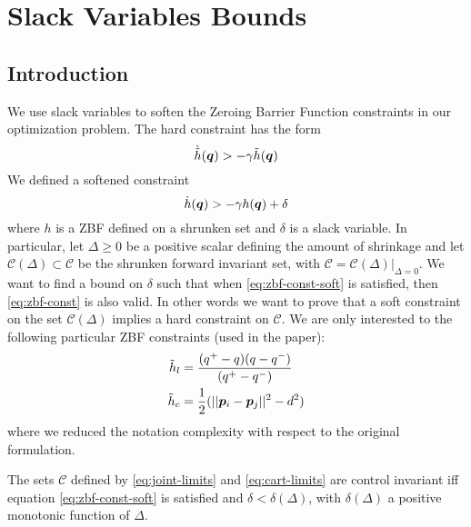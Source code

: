 \section{Slack Variables Bounds} \label{app:slack}
\subsection{Introduction}
We use slack variables to soften the Zeroing Barrier Function constraints in our optimization problem. The hard constraint has the form
\begin{equation} \label{eq:zbf-const}
    \dot{\tilde{h}}(\bm{q}) > -\gamma \tilde{h}(\bm{q})
\end{equation}
We defined a softened constraint
\begin{equation} \label{eq:zbf-const-soft}
    \dot{h}(\bm{q}) > -\gamma h(\bm{q}) + \delta
\end{equation}
where $h$ is a ZBF defined on a shrunken set and $\delta$ is a slack variable. In particular, let $\Delta \geq 0$ be a positive scalar defining the amount of shrinkage and let $\mathcal{C}(\Delta) \subset \mathcal{C}$ be the shrunken forward invariant set, with $\mathcal{C} = \mathcal{C}(\Delta)|_{\Delta=0}$. We want to find a bound on $\delta$ such that when \eqref{eq:zbf-const-soft} is satisfied, then \eqref{eq:zbf-const} is also valid. In other words we want to prove that a soft constraint on the set $\mathcal{C}(\Delta)$ implies a hard constraint on $\mathcal{C}$. We are only interested to the following particular ZBF constraints (used in the paper):
\begin{align}
    \tilde{h}_{l} &= \frac{(q^+ - q)(q - q^-)}{(q^+ - q^-)} \label{eq:joint-limits}\\
    \tilde{h}_{c} &= \frac{1}{2}(||\bm{p}_{i} - \bm{p}_{j}||^2 - d^2) \label{eq:cart-limits}
\end{align}
where we reduced the notation complexity with respect to the original formulation. 

\begin{theorem}
The sets $\mathcal{C}$ defined by \eqref{eq:joint-limits} and \eqref{eq:cart-limits} are control invariant iff equation \eqref{eq:zbf-const-soft} is satisfied and $\delta < \delta(\Delta)$, with $\delta(\Delta)$ a positive monotonic function of $\Delta$. 
\end{theorem}

